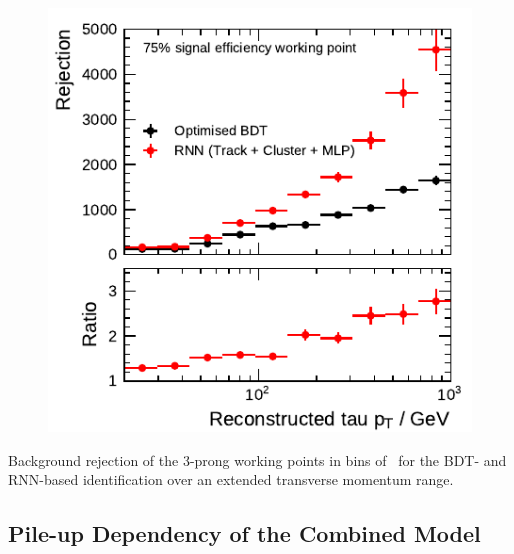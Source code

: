 \begin{minipage}{\textwidth}
\begin{subfigure}[t]{0.48\textwidth}
  \end{subfigure}
  \begin{subfigure}[t]{0.48\textwidth}
    \centering
    \includegraphics{./figures/rnn/combined/highpt/rnn_loose_3p.pdf}
  \end{subfigure}
  \caption[Background rejection of the 3-prong working points in bins of
  \tauhadvis~\pt for the RNN-based identification (extended \tauhadvis~\pt
  range)]{Background rejection of the 3-prong working points in bins of
    \tauhadvis~\pt for the BDT- and RNN-based identification over an extended
    transverse momentum range.}
\end{minipage}

\clearpage
\subsection{Pile-up Dependency of the Combined Model}

